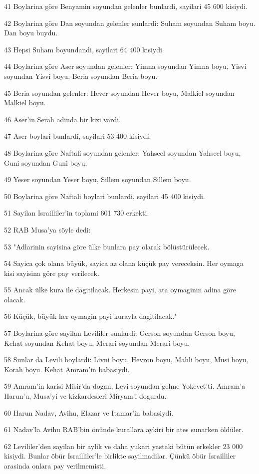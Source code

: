 \par 41 Boylarina göre Benyamin soyundan gelenler bunlardi, sayilari 45 600 kisiydi.
\par 42 Boylarina göre Dan soyundan gelenler sunlardi: Suham soyundan Suham boyu. Dan boyu buydu.
\par 43 Hepsi Suham boyundandi, sayilari 64 400 kisiydi.
\par 44 Boylarina göre Aser soyundan gelenler: Yimna soyundan Yimna boyu, Yisvi soyundan Yisvi boyu, Beria soyundan Beria boyu.
\par 45 Beria soyundan gelenler: Hever soyundan Hever boyu, Malkiel soyundan Malkiel boyu.
\par 46 Aser'in Serah adinda bir kizi vardi.
\par 47 Aser boylari bunlardi, sayilari 53 400 kisiydi.
\par 48 Boylarina göre Naftali soyundan gelenler: Yahseel soyundan Yahseel boyu, Guni soyundan Guni boyu,
\par 49 Yeser soyundan Yeser boyu, Sillem soyundan Sillem boyu.
\par 50 Boylarina göre Naftali boylari bunlardi, sayilari 45 400 kisiydi.
\par 51 Sayilan Israilliler'in toplami 601 730 erkekti.
\par 52 RAB Musa'ya söyle dedi:
\par 53 "Adlarinin sayisina göre ülke bunlara pay olarak bölüstürülecek.
\par 54 Sayica çok olana büyük, sayica az olana küçük pay vereceksin. Her oymaga kisi sayisina göre pay verilecek.
\par 55 Ancak ülke kura ile dagitilacak. Herkesin payi, ata oymaginin adina göre olacak.
\par 56 Küçük, büyük her oymagin payi kurayla dagitilacak."
\par 57 Boylarina göre sayilan Levililer sunlardi: Gerson soyundan Gerson boyu, Kehat soyundan Kehat boyu, Merari soyundan Merari boyu.
\par 58 Sunlar da Levili boylardi: Livni boyu, Hevron boyu, Mahli boyu, Musi boyu, Korah boyu. Kehat Amram'in babasiydi.
\par 59 Amram'in karisi Misir'da dogan, Levi soyundan gelme Yokevet'ti. Amram'a Harun'u, Musa'yi ve kizkardesleri Miryam'i dogurdu.
\par 60 Harun Nadav, Avihu, Elazar ve Itamar'in babasiydi.
\par 61 Nadav'la Avihu RAB'bin önünde kurallara aykiri bir ates sunarken öldüler.
\par 62 Levililer'den sayilan bir aylik ve daha yukari yastaki bütün erkekler 23 000 kisiydi. Bunlar öbür Israilliler'le birlikte sayilmadilar. Çünkü öbür Israilliler arasinda onlara pay verilmemisti.
